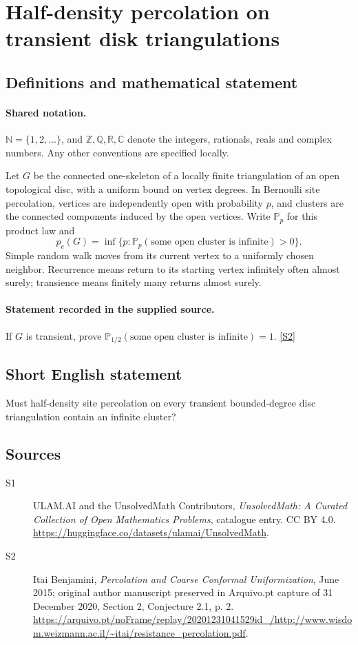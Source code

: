 \documentclass[11pt]{article}
\newcommand{\sref}[2]{\hyperlink{source:#1:#2}{[S#2]}}
\begin{document}
\section{Half-density percolation on transient disk triangulations}\label{statement}

\subsection{Definitions and mathematical statement}

\paragraph{Shared notation.}$\mathbb N=\{1,2,\ldots\}$, and $\mathbb Z,\mathbb Q,\mathbb R,\mathbb C$ denote the integers, rationals, reals and complex numbers. Any other conventions are specified locally.


Let $G$ be the connected one-skeleton of a locally finite triangulation of an open topological disc, with a uniform bound on vertex degrees. In Bernoulli site percolation, vertices are independently open with probability $p$, and clusters are the connected components induced by the open vertices. Write $\mathbb P_p$ for this product law and
\[p_c(G)=\inf\{p:\mathbb P_p(\text{some open cluster is infinite})>0\}.\]
Simple random walk moves from its current vertex to a uniformly chosen neighbor. Recurrence means return to its starting vertex infinitely often almost surely; transience means finitely many returns almost surely.
\paragraph{Statement recorded in the supplied source.}
If $G$ is transient, prove $\mathbb P_{1/2}(\text{some open cluster is infinite})=1$. \sref{statement}{2}
\subsection{Short English statement}
Must half-density site percolation on every transient bounded-degree disc triangulation contain an infinite cluster?
\subsection{Sources}
\begin{description}
\item[\hypertarget{source:statement:1}{S1}] ULAM.AI and the UnsolvedMath Contributors, \emph{UnsolvedMath: A Curated Collection of Open Mathematics Problems}, catalogue entry. CC BY 4.0. \url{https://huggingface.co/datasets/ulamai/UnsolvedMath}.
\item[\hypertarget{source:statement:2}{S2}] Itai Benjamini, \emph{Percolation and Coarse Conformal Uniformization}, June 2015; original author manuscript preserved in Arquivo.pt capture of 31 December 2020, Section 2, Conjecture 2.1, p. 2. \url{https://arquivo.pt/noFrame/replay/20201231041529id_/http://www.wisdom.weizmann.ac.il/~itai/resistance_percolation.pdf}.
\end{description}
\label{end:statement}
\end{document}
